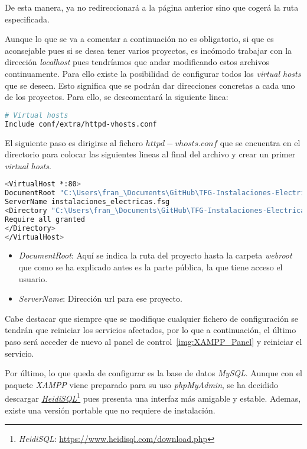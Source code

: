 De esta manera, ya no redireccionará a la página anterior sino que cogerá la ruta especificada.

Aunque lo que se va a comentar a continuación no es obligatorio, si que es aconsejable pues si se desea tener varios proyectos, es incómodo trabajar con la dirección \textit{localhost} pues tendríamos que andar modificando estos archivos continuamente. Para ello existe la posibilidad de configurar todos los \textit{virtual hosts} que se deseen. Esto significa que se podrán dar direcciones concretas a cada uno de los proyectos. Para ello, se descomentará la siguiente linea:

\begin{lstlisting}[language=bash]
# Virtual hosts
Include conf/extra/httpd-vhosts.conf
\end{lstlisting}

El siguiente paso es dirigirse al fichero $httpd-vhosts.conf$ que se encuentra en el directorio \textit{} para colocar las siguientes lineas al final del archivo y crear un primer \textit{virtual hosts}.

\begin{lstlisting}[language=bash]
<VirtualHost *:80>
DocumentRoot "C:\Users\fran_\Documents\GitHub\TFG-Instalaciones-Electricas\web\instalaciones_electricas\webroot"
ServerName instalaciones_electricas.fsg
<Directory "C:\Users\fran_\Documents\GitHub\TFG-Instalaciones-Electricas\web\instalaciones_electricas\webroot">
Require all granted
</Directory>
</VirtualHost>
\end{lstlisting}

\begin{itemize}
\item \textit{DocumentRoot}: Aquí se indica la ruta del proyecto hasta la carpeta \textit{webroot} que como se ha explicado antes es la parte pública, la que tiene acceso el usuario.
\item \textit{ServerName}: Dirección url para ese proyecto.
\end{itemize}

Cabe destacar que siempre que se modifique cualquier fichero de configuración se tendrán que reiniciar los servicios afectados, por lo que a continuación, el último paso será acceder de nuevo al panel de control~\ref{img:XAMPP_Panel} y reiniciar el servicio.

Por último, lo que queda de configurar es la base de datos \textit{MySQL}. Aunque con el paquete \textit{XAMPP} viene preparado para su uso \textit{phpMyAdmin}, se ha decidido descargar \href{https://www.heidisql.com/download.php}{\textit{HeidiSQL}}\footnote{\textit{HeidiSQL}: \url{https://www.heidisql.com/download.php}} pues presenta una interfaz más amigable y estable. Ademas, existe una versión portable que no requiere de instalación.

